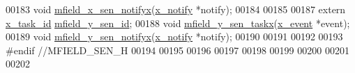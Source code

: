 \begin{DoxyCode}
00183 \textcolor{keywordtype}{void} \hyperlink{a00019_ac28a2b5f3fa92c0593446e15a63a501c}{mfield\_x\_sen\_notifyx}(\hyperlink{a00036_df/d4c/a00851}{x\_notify} *notify);
00184 
00185 
00187 \textcolor{keyword}{extern} \hyperlink{a00036_ad5c3c5fbfd3e4aadf22830395484a71d}{x\_task\_id} \hyperlink{a00019_a99c4ad3cf8b9ce2b67351d6edf48f937}{mfield\_y\_sen\_id};
00188 \textcolor{keywordtype}{void} \hyperlink{a00019_adfb4e8d328a4cd1c7639082bef5841a9}{mfield\_y\_sen\_taskx}(\hyperlink{a00036_de/d37/a00849}{x\_event} *event);
00189 \textcolor{keywordtype}{void} \hyperlink{a00019_a80b82366f7d22e925f279d20328f05c8}{mfield\_y\_sen\_notifyx}(\hyperlink{a00036_df/d4c/a00851}{x\_notify} *notify);
00190 
00191 
00192 
00193 \textcolor{preprocessor}{#endif   //MFIELD\_SEN\_H}
00194 
00195 
00196 
00197 
00198 
00199 
00200 
00201 
00202 
\end{DoxyCode}
